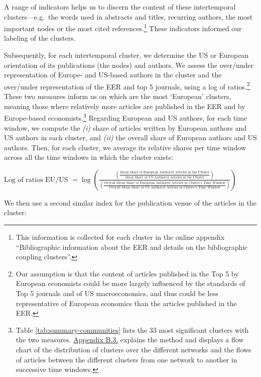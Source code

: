 \documentclass[
  12pt,
  onecolumn]{article}
\begin{document}
A range of indicators helps us to discern the content of these
intertemporal clusters---e.g.~the words used in abstracts and titles,
recurring authors, the most important nodes or the most cited
references.\footnote{This information is collected for each cluster in
  the online appendix ``Bibliographic information about the EER and
  details on the bibliographic coupling clusters''.} These indicators
informed our labeling of the clusters.

Subsequently, for each intertemporal cluster, we determine the US or
European orientation of its publications (the nodes) and authors. We
assess the over/under representation of Europe- and US-based authors in
the cluster and the over/under representation of the EER and top 5
journals, using a log of ratios.\footnote{Our assumption is that the
  content of articles published in the Top 5 by European economists
  could be more largely influenced by the standards of Top 5 journals
  and of US macroeconomics, and thus could be less representative of
  European economics than the articles published in the EER.} These two
measures inform us on which are the most `European' clusters, meaning
those where relatively more articles are published in the EER and by
Europe-based economists.\footnote{Table \ref{tab:summary-communities}
  lists the 33 most significant clusters with the two measures.
  \protect\hyperlink{network}{Appendix B.3.} explains the method and
  displays a flow chart of the distribution of clusters over the
  different networks and the flows of articles between the different
  clusters from one network to another in successive time windows.}
Regarding European and US authors, for each time window, we compute the
\emph{(i)} share of articles written by European authors and US authors
in each cluster, and \emph{(ii)} the overall share of European authors
and US authors. Then, for each cluster, we average its relative shares
per time window across all the time windows in which the cluster exists:

\bigskip

\({\scriptstyle \text{Log of ratios EU/US }=\log(\frac{(\frac{\text{Mean Share of European Authored Articles in the Cluster}}{\text{Mean Share of US Authored Articles in the Cluster}})} {(\frac{\text{Overall Mean Share of European Authored Articles in Cluster's Time Window}}{\text{Overall Mean Share of US Authored Articles in Cluster's Time Window}})})}\)
\bigskip

We then use a second similar index for the publication venue of the
articles in the cluster:
\end{document}

